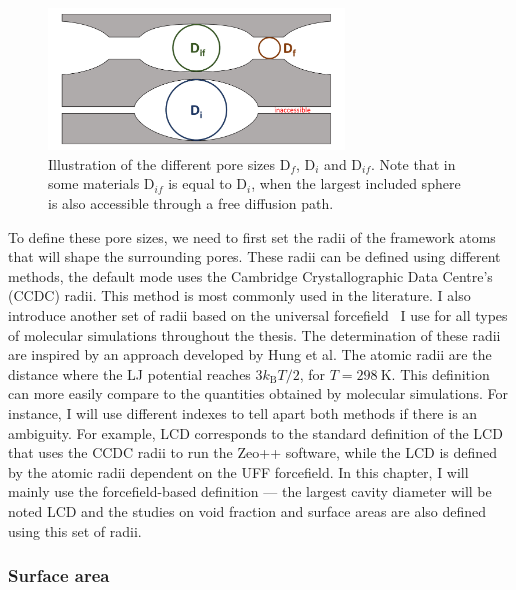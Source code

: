 \documentclass[main.tex]{subfiles}
\begin{document}
\begin{figure}[ht]
  \centering
  \includegraphics[width=0.7\textwidth]{figures/2-thermo/pores.pdf}
  \caption{Illustration of the different pore sizes D$_f$, D$_i$ and D$_{if}$. Note that in some materials D$_{if}$ is equal to D$_i$, when the largest included sphere is also accessible through a free diffusion path. }\label{fgr:pore_size}
\end{figure}

To define these pore sizes, we need to first set the radii of the framework atoms that will shape the surrounding pores. These radii can be defined using different methods, the default mode uses the Cambridge Crystallographic Data Centre's (CCDC) radii. This method is most commonly used in the literature. I also introduce another set of radii based on the universal forcefield~\autocite{rappe1992} I use for all types of molecular simulations throughout the thesis. The determination of these radii are inspired by an approach developed by Hung et al.\autocite{Hung_2021} The atomic radii are the distance where the LJ potential reaches $3 k_\text{B} T/2$, for $T = \SI{298}{\kelvin}$. This  definition can  more easily compare to the quantities obtained by molecular simulations. For instance, I will use different indexes to tell apart both methods if there is an ambiguity. For example, LCD corresponds to the standard definition of the LCD that uses the CCDC radii to run the Zeo++ software, while the LCD is defined by the atomic radii dependent on the UFF forcefield. In this chapter, I will mainly use the forcefield-based definition --- the largest cavity diameter will be noted LCD and the studies on void fraction and surface areas are also defined using this set of radii.


\subsubsection{Surface area}
\end{document}
